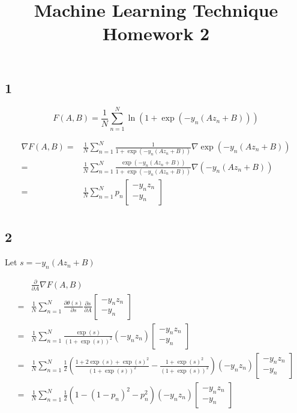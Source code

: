 \documentclass[fleqn,a4paper,12pt]{article}
\title{Machine Learning Technique Homework 2}
\date{}
\begin{document}
\maketitle
\thispagestyle{fancy}

\subsection*{1}

$$F(A, B) = \frac{1}{N} \sum_{n=1}^N \ln(1 + \exp(- y_n (A z_n + B)))$$

\begin{align*}
\nabla F(A, B) =& \frac{1}{N} \sum_{n=1}^N \frac{1}{1 + \exp(-y_n(A z_n + B))} \nabla \exp(-y_n(A z_n + B)) \\
=& \frac{1}{N} \sum_{n=1}^{N} \frac{\exp(-y_n(A z_n + B))}{1 + \exp(-y_n(A z_n + B))} \nabla (-y_n(A z_n + B)) \\
=& \frac{1}{N} \sum_{n=1}^{N} p_n  \begin{bmatrix}-y_n z_n \\ -y_n\end{bmatrix} \\
\end{align*}

\subsection*{2}

Let $s = -y_n (A z_n + B)$

\begin{align*}
 & \frac{\partial}{\partial A} \nabla F(A, B) \\
=& \frac{1}{N} \sum_{n=1}^{N} \frac{\partial \theta(s)}{\partial s} \frac{\partial s}{\partial A} \begin{bmatrix}-y_n z_n \\ -y_n\end{bmatrix} \\
=& \frac{1}{N} \sum_{n=1}^{N} \frac{\exp(s)}{(1 + \exp(s))^2} (- y_n z_n) \begin{bmatrix}-y_n z_n \\ -y_n\end{bmatrix} \\
=& \frac{1}{N} \sum_{n=1}^{N} \frac{1}{2}(\frac{1 + 2\exp(s) + \exp(s)^2}{(1 + \exp(s))^2} - \frac{1 + \exp(s)^2}{(1 + \exp(s))^2} ) (- y_n z_n) \begin{bmatrix}-y_n z_n \\ -y_n\end{bmatrix} \\
=& \frac{1}{N} \sum_{n=1}^{N} \frac{1}{2} (1 - (1 - p_n)^2 - p_n^2) (- y_n z_n) \begin{bmatrix}-y_n z_n \\ -y_n\end{bmatrix}
\end{align*}
\end{document}

